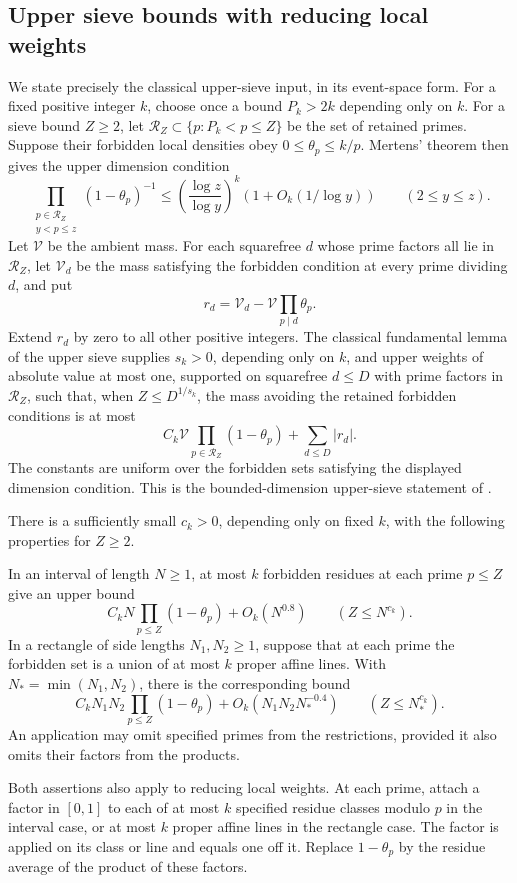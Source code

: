 \subsection{Upper sieve bounds with reducing local weights}

We state precisely the classical upper-sieve input, in its event-space
form.  For a fixed positive integer $k$, choose once a bound $P_k>2k$
depending only on $k$.  For a sieve bound $Z\ge2$, let
$\mathcal R_Z\subset\{p:P_k<p\le Z\}$ be the set of retained primes.
Suppose their forbidden local densities obey $0\le\theta_p\le k/p$.
Mertens' theorem then gives the upper dimension condition
\[
 \prod_{\substack{p\in\mathcal R_Z\\y<p\le z}}(1-\theta_p)^{-1}
 \le\left(\frac{\log z}{\log y}\right)^k
                      \left(1+O_k(1/\log y)\right)\qquad(2\le y\le z).
\]
Let $\mathcal V$ be the ambient mass.  For each
squarefree $d$ whose prime factors all lie in $\mathcal R_Z$, let $\mathcal V_d$
be the mass satisfying the forbidden condition at every prime dividing $d$,
and put
\[
 r_d=\mathcal V_d-\mathcal V\prod_{p\mid d}\theta_p.
\]
Extend $r_d$ by zero to all other positive integers.  The classical
fundamental lemma of the upper sieve supplies $s_k>0$, depending only on
$k$, and upper weights of absolute value at most one, supported on squarefree
$d\le D$ with prime factors in $\mathcal R_Z$, such that, when $Z\le D^{1/s_k}$,
the mass avoiding the retained forbidden conditions is at most
\[
 C_k\mathcal V\prod_{p\in\mathcal R_Z}(1-\theta_p)
                     +\sum_{d\le D}|r_d|.
\]
The constants are uniform over the forbidden sets satisfying the displayed
dimension condition.  This is the bounded-dimension upper-sieve statement of
\cite[Theorems 2.4 and 3.6]{FordSieve2023}.

\begin{lemma}
\label{lem:arith-weighted-sieve}
There is a sufficiently small $c_k>0$, depending only on fixed $k$, with
the following properties for $Z\ge2$.

In an interval of length $N\ge1$, at most $k$ forbidden residues at each prime
$p\le Z$ give an upper bound
\[
 C_kN\prod_{p\le Z}(1-\theta_p)+O_k(N^{0.8})
       \qquad(Z\le N^{c_k}).
\]
In a rectangle of side lengths $N_1,N_2\ge1$, suppose that at each prime the
forbidden set is a union of at most $k$ proper affine lines.  With
$N_* =\min(N_1,N_2)$, there is the corresponding bound
\[
 C_kN_1N_2\prod_{p\le Z}(1-\theta_p)
       +O_k(N_1N_2N_*^{-0.4})
       \qquad(Z\le N_*^{c_k}).
\]
An application may omit specified primes from the restrictions, provided
it also omits their factors from the products.

Both assertions also apply to reducing local weights.  At each prime,
attach a factor in $[0,1]$ to each of at most $k$ specified residue
classes modulo $p$ in the interval case, or at most $k$ proper affine
lines in the rectangle case.  The factor is applied on its class or line
and equals one off it.  Replace $1-\theta_p$ by the residue average of
the product of these factors.
\end{lemma}


